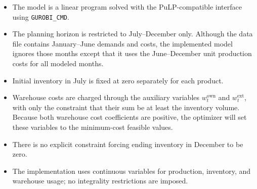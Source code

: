 \begin{itemize}
    \item The model is a linear program solved with the PuLP-compatible interface using \texttt{GUROBI\_CMD}.
    \item The planning horizon is restricted to July--December only. Although the data file contains January--June demands and costs, the implemented model ignores those months except that it uses the June--December unit production costs for all modeled months.
    \item Initial inventory in July is fixed at zero separately for each product.
    \item Warehouse costs are charged through the auxiliary variables $w^{\mathrm{own}}_t$ and $w^{\mathrm{ext}}_t$, with only the constraint that their sum be at least the inventory volume. Because both warehouse cost coefficients are positive, the optimizer will set these variables to the minimum-cost feasible values.
    \item There is no explicit constraint forcing ending inventory in December to be zero.
    \item The implementation uses continuous variables for production, inventory, and warehouse usage; no integrality restrictions are imposed.
\end{itemize}
